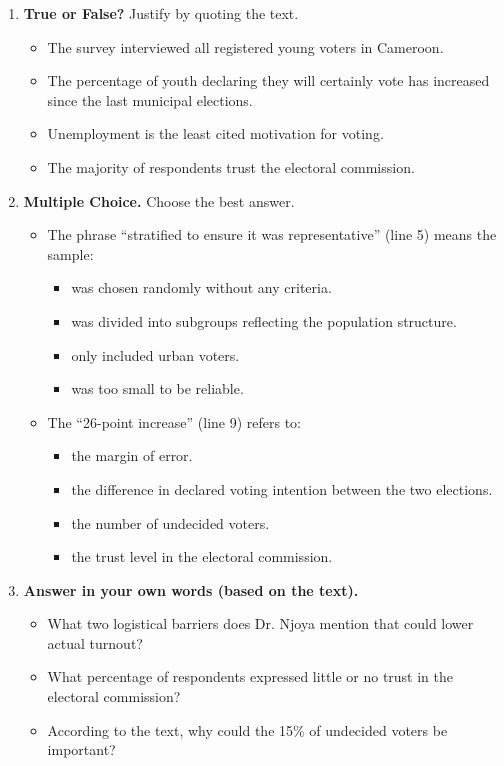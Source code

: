 \documentclass[11pt]{article}
\begin{document}
\begin{exercice}
\begin{enumerate}
\item \textbf{True or False?} Justify by quoting the text.
\begin{itemize}
\item[a)] The survey interviewed all registered young voters in Cameroon.
\item[b)] The percentage of youth declaring they will certainly vote has increased since the last municipal elections.
\item[c)] Unemployment is the least cited motivation for voting.
\item[d)] The majority of respondents trust the electoral commission.
\end{itemize}
\item \textbf{Multiple Choice.} Choose the best answer.
\begin{itemize}
\item[1.] The phrase “stratified to ensure it was representative” (line 5) means the sample:
\begin{itemize}
\item[A] was chosen randomly without any criteria.
\item[B] was divided into subgroups reflecting the population structure.
\item[C] only included urban voters.
\item[D] was too small to be reliable.
\end{itemize}
\item[2.] The “26-point increase” (line 9) refers to:
\begin{itemize}
\item[A] the margin of error.
\item[B] the difference in declared voting intention between the two elections.
\item[C] the number of undecided voters.
\item[D] the trust level in the electoral commission.
\end{itemize}
\end{itemize}
\item \textbf{Answer in your own words (based on the text).}
\begin{itemize}
\item[a)] What two logistical barriers does Dr. Njoya mention that could lower actual turnout?
\item[b)] What percentage of respondents expressed little or no trust in the electoral commission?
\item[c)] According to the text, why could the 15\% of undecided voters be important?

\end{itemize}
\end{enumerate}
\end{exercice}
\end{document}
